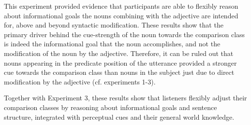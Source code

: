 This experiment provided evidence that participants are able to flexibly reason about informational goals the nouns combining with the adjective are intended for, above and beyond syntactic modification. These results show that the primary driver behind the cue-strength of the noun towards the comparison class is indeed the informational goal that the noun accomplishes, and not the modification of the noun by the adjective.  Therefore, it can be ruled out that nouns appearing in the predicate position of the utterance provided a stronger cue towards the comparison class than nouns in the subject just due to direct modification by the adjective (cf. experiments 1-3). 

Together with Experiment 3, these results show that listeners flexibly adjust their comparison classes by reasoning about informational goals and sentence structure, integrated with perceptual cues and their general world knowledge.   
   
